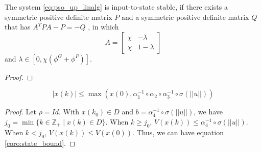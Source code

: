 \begin{mythm}
The system \eqref{eq:pso_up_linalg} is input-to-state stable, if there exists a symmetric positive definite matrix $ P $ and a symmetric positive definite matrix $ Q $ that has $ A^{T} P A - P = - Q $ , in which 
\begin{equation}
A = 
\begin{bmatrix}
\chi & - \lambda \\
\chi & 1 - \lambda
\end{bmatrix}
\end{equation}
and $ \lambda \in [0, \chi ( \phi^{G} + \phi^{P} ) ] $.

\begin{proof}


\end{proof}
\end{mythm}

\begin{mycoro}
\label{coro:state_bound}
\begin{equation}
\label{eq:state_bound}
| x(k) | \leq \max ( x(0) , \alpha_{1}^{-1} \circ \alpha_{2} \circ \alpha_{3}^{-1} \circ \sigma ( || u || ) )
\end{equation}
\begin{proof}
Let $ \rho = Id $.
With $ x( k_{0} ) \in D $ and $ b = \alpha_{4}^{-1} \circ \sigma ( || u || ) $,
we have $ j_{0} = \min \{ k \in \mathbb{Z}_{+} \mid x(k) \in D \} $.
When $ k \geq j_{0} $, $ V( x(k) ) \leq \alpha_{4}^{-1} \circ \sigma ( || u ||  ) $.
When $ k < j_{0} $, $ V( x(k) ) \leq V( x(0) ) $.
Thus, we can have equation \eqref{coro:state_bound}.
\end{proof}
\end{mycoro}